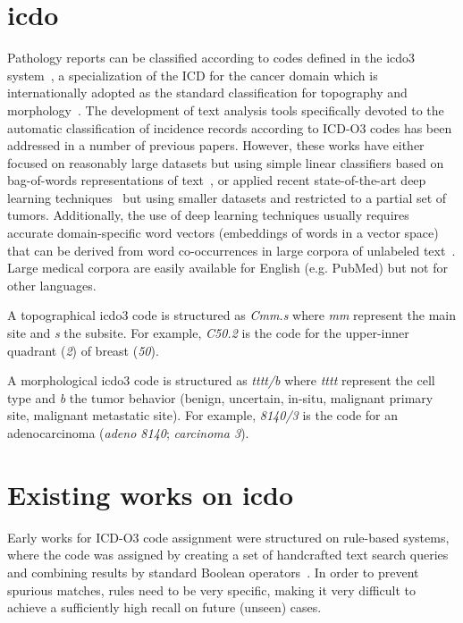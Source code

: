 \section{\ac{icdo}}\label{sec:icdoCodes}
Pathology reports can be classified according
to codes defined in the \ac{icdo3}
system~\cite{fritz_international_2000}, a specialization of the ICD
for the cancer domain which is internationally adopted as the standard
classification for topography and
morphology~\cite{airtum_handbook_2008}.  The development of text
analysis tools specifically devoted to the automatic classification of
incidence records according to ICD-O3 codes has been addressed in a
number of previous papers. However, these
works have either focused on reasonably large datasets but
using simple linear classifiers based on bag-of-words representations
of text~\cite{jouhet_automated_2011,kavuluru_automatic_2013}, or
applied recent state-of-the-art deep learning
techniques~\cite{gao_hierarchical_2018,qiu_deep_2018} but using
smaller datasets and restricted to a partial set of
tumors. Additionally, the use of deep learning techniques usually
requires accurate domain-specific word vectors (embeddings of words in
a vector space) that can be derived from word co-occurrences in large
corpora of unlabeled
text~\cite{mikolov_linguistic_2013,pennington_glove:_2014,devlin2018bert}. Large
medical corpora are easily available for English (e.g. PubMed) but not
 for other languages.

A topographical \ac{icdo3} code is structured as \emph{Cmm.s} where
\emph{mm} represent the main site and \emph{s} the subsite. For example, \emph{C50.2}
is the code for the upper-inner quadrant (\emph{2}) of breast (\emph{50}).

A morphological \ac{icdo3} code is structured as \emph{tttt/b}
where \emph{tttt} represent the cell type and \emph{b} the tumor
behavior (benign, uncertain, in-situ, malignant primary site,
malignant metastatic site). For example, \emph{8140/3}
is the code for an adenocarcinoma (\emph{adeno 8140};
\emph{carcinoma 3}).

\section{Existing works on \ac{icdo}}
Early works for ICD-O3 code assignment were structured on rule-based
systems, where the code was assigned by creating a set of handcrafted
text search queries and combining results by standard Boolean
operators~\cite{crocetti_automatic_2004}. In order to prevent spurious
matches, rules need to be very specific, making it very difficult to
achieve a sufficiently high recall on future (unseen) cases.

